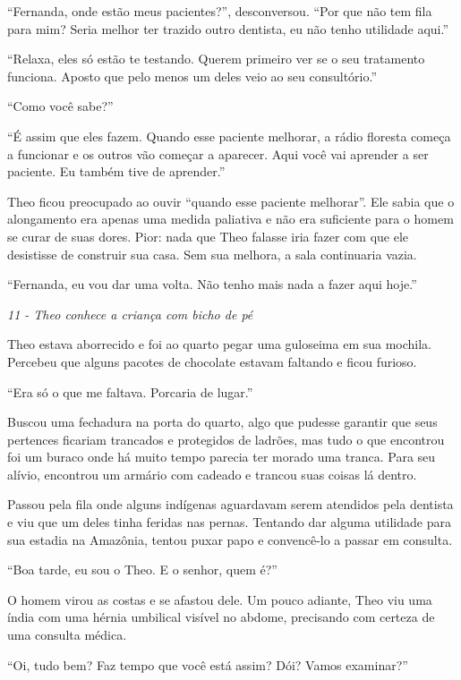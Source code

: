 ``Fernanda, onde estão meus pacientes?'', desconversou. ``Por que não
tem fila para mim? Seria melhor ter trazido outro dentista, eu não tenho
utilidade aqui.''

``Relaxa, eles só estão te testando. Querem primeiro ver se o seu
tratamento funciona. Aposto que pelo menos um deles veio ao seu
consultório.''

``Como você sabe?''

``É assim que eles fazem. Quando esse paciente melhorar, a rádio
floresta começa a funcionar e os outros vão começar a aparecer. Aqui
você vai aprender a ser paciente. Eu também tive de aprender.''

Theo ficou preocupado ao ouvir ``quando esse paciente melhorar''. Ele
sabia que o alongamento era apenas uma medida paliativa e não era
suficiente para o homem se curar de suas dores. Pior: nada que Theo
falasse iria fazer com que ele desistisse de construir sua casa. Sem sua
melhora, a sala continuaria vazia.

``Fernanda, eu vou dar uma volta. Não tenho mais nada a fazer aqui
hoje.''

\asterisc

\emph{11 - Theo conhece a criança com bicho de pé}

Theo estava aborrecido e foi ao quarto pegar uma guloseima em sua
mochila. Percebeu que alguns pacotes de chocolate estavam faltando e
ficou furioso.

``Era só o que me faltava. Porcaria de lugar.''

Buscou uma fechadura na porta do quarto, algo que pudesse garantir que
seus pertences ficariam trancados e protegidos de ladrões, mas tudo o
que encontrou foi um buraco onde há muito tempo parecia ter morado uma
tranca. Para seu alívio, encontrou um armário com cadeado e trancou suas
coisas lá dentro.

Passou pela fila onde alguns indígenas aguardavam serem atendidos pela
dentista e viu que um deles tinha feridas nas pernas. Tentando dar
alguma utilidade para sua estadia na Amazônia, tentou puxar papo e
convencê-lo a passar em consulta.

``Boa tarde, eu sou o Theo. E o senhor, quem é?''

O homem virou as costas e se afastou dele. Um pouco adiante, Theo viu
uma índia com uma hérnia umbilical visível no abdome, precisando com
certeza de uma consulta médica.

``Oi, tudo bem? Faz tempo que você está assim? Dói? Vamos examinar?''

